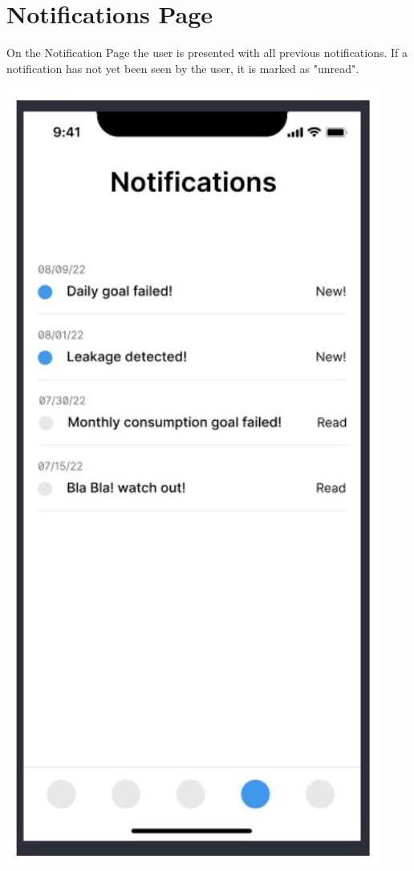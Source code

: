 \documentclass[10pt]{article}
\begin{document}
\section{Notifications Page}
On the Notification Page the user is presented with all previous notifications. If a notification has not yet been seen by the user, it is marked as "unread".

\includegraphics[max width=\textwidth]{2022_11_16_e80008f3d60227bff292g-7(1)}
\end{document}
